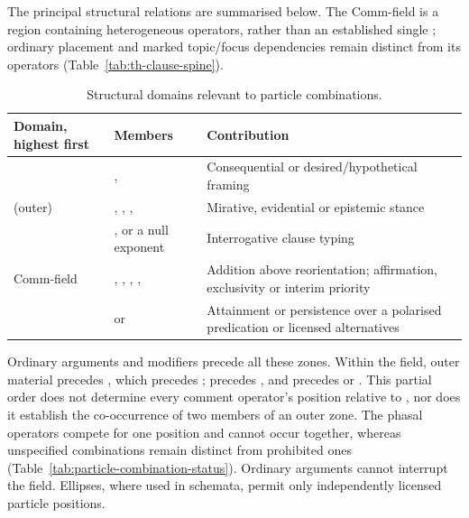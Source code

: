 The principal structural relations are summarised below. The Comm-field is
a region containing heterogeneous operators, rather than an established
single ; ordinary placement and marked topic/focus
dependencies remain distinct from its operators
(Table~\ref{tab:th-clause-spine}).

\begin{table}[ht]
\footnotesize
\caption{Structural domains relevant to particle combinations.}
\label{tab:particle-combination-domains}
\begin{tabularx}{\textwidth}{l L L}
\toprule
Domain, highest first & Members & Contribution \\
\midrule
{} & ,  &
Consequential or desired/hypothetical framing \\
 (outer) & , , ,  &
Mirative, evidential or epistemic stance \\
 & , or a null exponent & Interrogative clause typing \\
Comm-field & , , , ,  &
Addition above reorientation; affirmation, exclusivity or interim priority \\
 &  or  &
Attainment or persistence over a polarised predication or licensed alternatives \\
\bottomrule
\end{tabularx}
\end{table}

Ordinary arguments and modifiers precede all these zones. Within the
field, outer material precedes , which precedes ;
 precedes , and  precedes  or
. This partial order does not determine every comment operator's
position relative to , nor does it establish the co-occurrence of
two members of an outer zone. The phasal operators compete for one position
and cannot occur together, whereas unspecified combinations remain distinct
from prohibited ones (Table~\ref{tab:particle-combination-status}). Ordinary
arguments cannot interrupt the field. Ellipses, where used in schemata,
permit only independently licensed particle positions.

